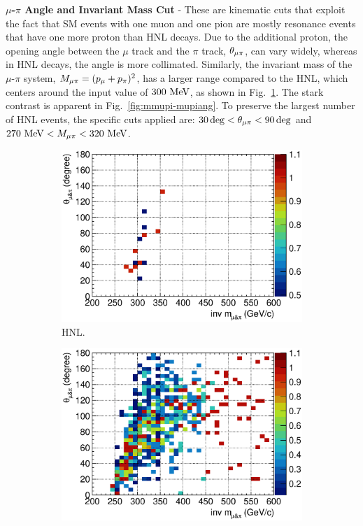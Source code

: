         \textbf{$\mu$-$\pi$ Angle and Invariant Mass Cut} - These are kinematic cuts that exploit the fact that SM events with one muon and one pion are mostly resonance events that have one more proton than HNL decays. Due to the additional proton, the opening angle between the $\mu$ track and the $\pi$ track, $\theta_{\mu\pi}$, can vary widely, whereas in HNL decays, the angle is more collimated. Similarly, the invariant mass of the $\mu$-$\pi$ system, $M_{\mu\pi}=(p_{\mu}+p_{\pi})^2$, has a larger range compared to the HNL, which centers around the input value of $300~\textrm{MeV}$, as shown in Fig.~\ref{fig:hnl-mmupi}.
        The stark contrast is apparent in Fig.~\ref{fig:mmupi-mupiang}. To preserve the largest number of HNL events, the specific cuts applied are: $30\deg < \theta_{\mu\pi} < 90\deg$ and $270~\textrm{MeV}<M_{\mu\pi}<320~\textrm{MeV}$. 
        \begin{figure}[!htb]
           \centering
           \begin{subfigure}{\dbfigwid\textwidth}
                \includegraphics[width=\textwidth]{figures/hnl/hnl_sfgmu_mpinvm_colnor_vs_mpang_hist2d_al9_300.eps}
                \caption{HNL.}
                \label{fig:hnl-mmupi}
           \end{subfigure}
           \begin{subfigure}{\dbfigwid\textwidth}
                \includegraphics[width=\textwidth]{figures/hnl/hnl_sfgmu_mpinvm_colnor_vs_mpang_hist2d_al9_SM.eps}

\end{subfigure}
\end{figure}
